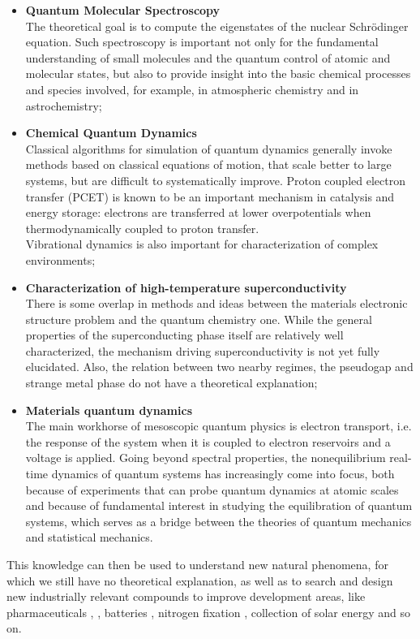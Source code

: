 \begin{enumerate}
\begin{itemize}
      \item \textbf{Quantum Molecular Spectroscopy} \\
      The theoretical goal is to compute the eigenstates of the nuclear Schrödinger equation. Such spectroscopy is important not only for the fundamental understanding of small molecules and the quantum control of atomic and molecular states, but also to provide insight into the basic chemical processes and species involved, for example, in atmospheric chemistry and in astrochemistry;
      
      \item \textbf{Chemical Quantum Dynamics} \\
      Classical algorithms for simulation of quantum dynamics generally invoke methods based on classical equations of motion, that scale better to large systems, but are difficult to systematically improve. Proton coupled electron transfer (PCET) is known to be an important mechanism in catalysis and energy storage: electrons are transferred at lower overpotentials when thermodynamically coupled to proton transfer. \\
      Vibrational dynamics is also important for characterization of complex environments;
      
      \item \textbf{Characterization of high-temperature superconductivity} \\
      There is some overlap in methods and ideas between the materials electronic structure problem and the quantum chemistry one. While the general properties of the superconducting phase itself are relatively well characterized, the mechanism driving superconductivity is not yet fully elucidated. Also, the relation between two nearby regimes, the pseudogap and strange metal phase do not have a theoretical explanation;
      
      \item \textbf{Materials quantum dynamics} \\
      The main workhorse of mesoscopic quantum physics is electron transport, i.e. the response of the system when it is coupled to electron reservoirs and a voltage is applied. Going beyond spectral properties, the nonequilibrium real-time dynamics of quantum systems has increasingly come into focus, both because of experiments that can probe quantum dynamics at atomic scales and because of fundamental interest in studying the equilibration of quantum systems, which serves as a bridge between the theories of quantum mechanics and statistical mechanics.
  \end{itemize}
  This knowledge can then be used to understand new natural phenomena, for which we still have no theoretical explanation, as well as to search and design new industrially relevant compounds to improve development areas, like pharmaceuticals \cite{Andersson2022Jun}, \cite{Blunt2022Jun}, batteries \cite{Kim2021Apr}, nitrogen fixation \cite{Reiher2017Jul}, collection of solar energy and so on.
  
\end{enumerate}

